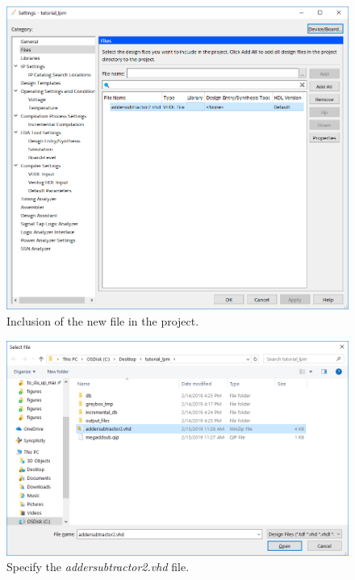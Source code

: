 \documentclass[11pt, twoside, pdftex]{article}
\begin{document}
\begin{figure}[H]
   \begin{center}
      \includegraphics[scale=0.65]{figures/figure15.png}
   \caption{Inclusion of the new file in the project.} 
	 \label{fig:15}
	 \end{center}
\end{figure}
 
\begin{figure}[H]
   \begin{center}
      \includegraphics[scale=0.65]{figures/figure16.png}
   \caption{Specify the {\it addersubtractor2.vhd} file.} 
	 \label{fig:16}
	 \end{center}
\end{figure} 
\end{document}
